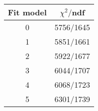 \begin{tabular}{c|c}
Fit model & $\chi^2/$ndf \\
\hline
0 & 5756/1645\\
1 & 5851/1661\\
2 & 5922/1677\\
3 & 6044/1707\\
4 & 6068/1723\\
5 & 6301/1739\\
\end{tabular}
